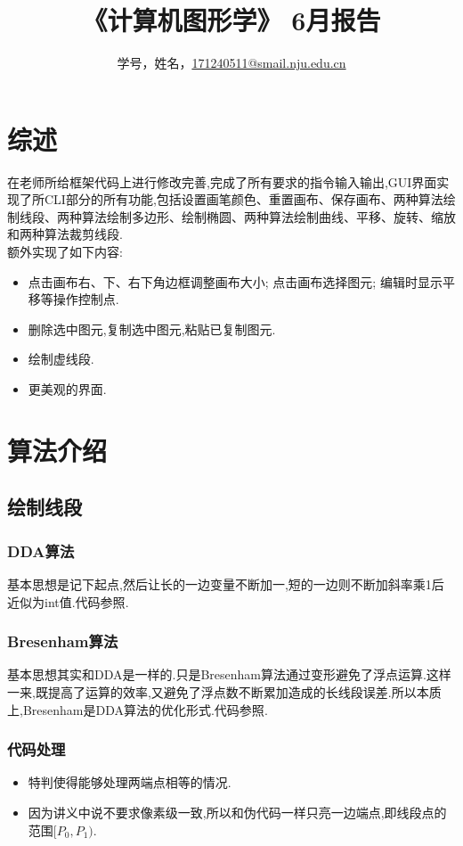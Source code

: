 \documentclass[a4paper,UTF8]{article}
\theoremstyle{definition}
\begin{document}
\title{\textbf{《计算机图形学》 6月报告 }}
\author{学号，姓名，\href{mailto:xxx@xxx.com}{171240511@smail.nju.edu.cn}}
\maketitle

\section{综述}
在老师所给框架代码上进行修改完善,完成了所有要求的指令输入输出,GUI界面实现了所CLI部分的所有功能,包括设置画笔颜色、重置画布、保存画布、两种算法绘制线段、两种算法绘制多边形、绘制椭圆、两种算法绘制曲线、平移、旋转、缩放和两种算法裁剪线段.\\
\indent 额外实现了如下内容:
\begin{itemize}
\item 点击画布右、下、右下角边框调整画布大小; 点击画布选择图元; 编辑时显示平移等操作控制点.
\item 删除选中图元,复制选中图元,粘贴已复制图元.
\item 绘制虚线段.
\item 更美观的界面.
\end{itemize}
\section{算法介绍}
\subsection{绘制线段}
\subsubsection{DDA算法} 
基本思想是记下起点,然后让长的一边变量不断加一,短的一边则不断加斜率乘1后近似为int值.代码参照\cite{rog_2002}.
\subsubsection{Bresenham算法} 
基本思想其实和DDA是一样的.只是Bresenham算法通过变形避免了浮点运算.这样一来,既提高了运算的效率,又避免了浮点数不断累加造成的长线段误差.所以本质上,Bresenham是DDA算法的优化形式.代码参照\cite{rog_2002}.
\subsubsection{代码处理}
\begin{itemize}
\item 特判使得能够处理两端点相等的情况.
\item 因为讲义中说不要求像素级一致,所以和伪代码一样只亮一边端点,即线段点的范围$[P_0,P_1)$.
\end{itemize}
\end{document}
